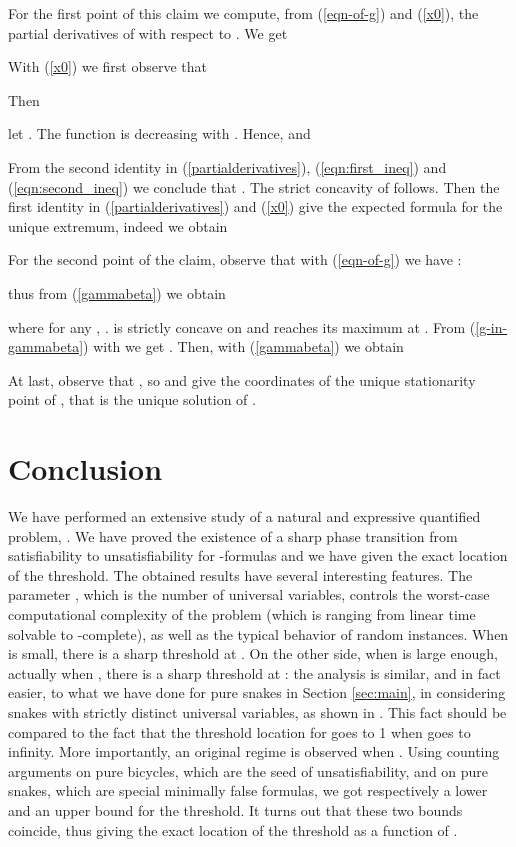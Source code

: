 \documentclass[aop,noinfoline]{imsart}
\renewcommand{\Box}{{\vrule width0.6ex height1em depth0cm}}
\newenvironment{proof}{\noindent{\bf Proof:}}{\hfill \Box}
\begin{document}
\begin{proof} 
 For the first point of this claim we compute, from (\ref{eqn-of-g}) and (\ref{x0}), the partial derivatives of  with respect to . We get
  
      With  (\ref{x0}) we  first   observe that  
      
Then

let . The function  is
decreasing with . Hence,  and

From the second identity in (\ref{partialderivatives}), (\ref{eqn:first_ineq}) and (\ref{eqn:second_ineq}) we conclude that . The  strict concavity of  follows.
Then the first identity in (\ref{partialderivatives}) and  (\ref{x0}) give the expected formula for the unique extremum, indeed we obtain 
  

\medskip

 For the second point of the claim, observe that with  (\ref{eqn-of-g}) we have :

 thus from (\ref{gammabeta}) we obtain 
  
 where for any  , .
   is strictly concave on  and reaches its maximum at . From (\ref{g-in-gammabeta}) with  we get 
. Then, with (\ref{gammabeta}) we obtain   

At last, observe that  , so 
        and   give the coordinates of the unique stationarity point of , that is the unique solution of
  .
 \\


\end{proof}



 \section{Conclusion}
 



We have performed an extensive study of a natural and expressive
quantified problem, . We have proved the existence of
a sharp phase transition from satisfiability to unsatisfiability
for -formulas and we have given the exact location of the
threshold. The obtained results have several interesting features.
The  parameter  , which is the number of universal variables,
controls the worst-case computational complexity of the problem
(which is ranging from linear time solvable to -complete),
as well as the typical behavior of random instances.    When 
is small, there is a sharp threshold at . On the other side,
when  is large enough, actually   when , there is a
sharp threshold at : the analysis is similar, and in fact
easier, to what we have done for pure snakes in Section
\ref{sec:main}, in considering snakes with strictly distinct
universal variables, as shown in \cite{CreignouDER-08}. This fact should be compared to the fact
that the threshold location  for  goes to 1 when  goes to infinity. More
importantly, an original regime is observed when . Using counting arguments on pure bicycles,
which are the seed of unsatisfiability, and on pure snakes, which
are special minimally false formulas, we got respectively a lower
and an upper bound for the threshold. It turns out that these two
bounds coincide, thus giving the exact location of the threshold
as a function of . 
\end{document}
